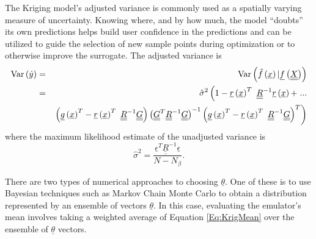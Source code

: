 The Kriging model's adjusted variance is commonly used as a spatially 
varying measure of uncertainty.  Knowing where, and by how much, the 
model ``doubts'' its own predictions helps build user confidence in 
the predictions and can be utilized to guide the selection of new 
sample points during optimization or to otherwise improve the 
surrogate.  The adjusted variance is
\begin{eqnarray*}
\label{Eq:KrigVar}
{\rm Var}\left(\hat{y}\right) &=& {\rm Var}\left(\hat{f}\left(\underline{x}\right)|\underline{f}\left(\underline{\underline{X}}\right)\right) \\ 
&=&\hat{\sigma}^2\left(1-\underline{r}\left(\underline{x}\right)^T\ \underline{\underline{R}}^{-1}\underline{r}\left(\underline{x}\right) + \right. ... \\
&&\left. \left(\underline{g}\left(\underline{x}\right)^T-\underline{r}\left(\underline{x}\right)^T\ \underline{\underline{R}}^{-1}\underline{\underline{G}}\right) \left(\underline{\underline{G}}^T\underline{\underline{R}}^{-1} \underline{\underline{G}}\right)^{-1}\left(\underline{g}\left(\underline{x}\right)^T-\underline{r}\left(\underline{x}\right)^T\ \underline{\underline{R}}^{-1}\underline{\underline{G}}\right)^T\right)
\end{eqnarray*}
where the maximum likelihood estimate of the unadjusted variance is
\begin{displaymath}
\hat{\sigma}^2=\frac{\underline{\epsilon}^T\underline{\underline{R}}^{-1}\underline{\epsilon}}{N-N_{\beta}}.
\end{displaymath}

There are two 
types of numerical approaches to choosing $\underline{\theta}$.  One of
these is to use Bayesian techniques such as Markov Chain Monte Carlo to
obtain a distribution represented by an ensemble of vectors 
$\underline{\theta}$.  In this case, evaluating the emulator's mean involves
taking a weighted average of Equation \ref{Eq:KrigMean} over the ensemble 
of $\underline{\theta}$ vectors.\newline

